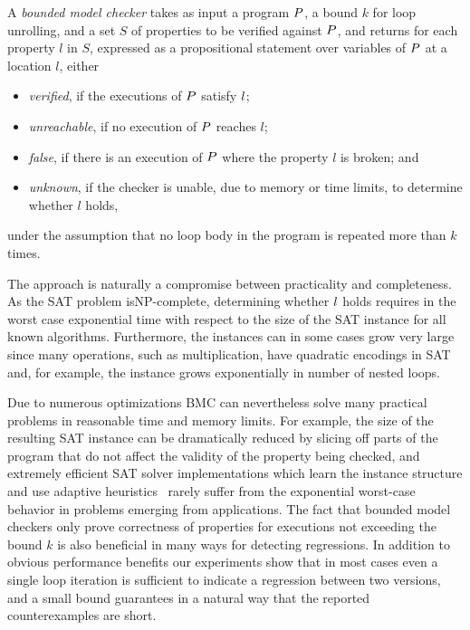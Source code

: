 A {\em bounded model checker} takes as input a program $P$, a bound $k$
for loop unrolling, and a set $S$ of properties to be verified against
$P$, and returns for each property ${l}$ in $S$, expressed as a propositional statement over variables of $P$ at a location $l$, either \vspace{-0.2cm}
\begin{itemize}
    \item \emph{verified}, if the executions of $P$  satisfy ${l}$;\vspace{-0.25cm}
    \item \emph{unreachable}, if no execution of $P$ reaches $l$;\vspace{-0.25cm}
    \item \emph{false}, if there is an execution of $P$
    where the property $l$ is broken; and\vspace{-0.25cm}
    \item \emph{unknown}, if the checker is unable, due to
    memory or time limits, to determine whether ${l}$ holds,\vspace{-0.2cm}
\end{itemize}
under the assumption that no loop body in the program is repeated more
than $k$ times.

The approach is naturally a compromise between practicality and
completeness.
%
As the SAT problem is\linebreak NP-complete, determining whether ${l}$ holds
requires in the worst case exponential time with respect to the size of
the SAT instance for all known algorithms.
%
Furthermore, the instances can in some cases grow very large since many
operations, such as multiplication, have quadratic encodings in SAT and,
for example, the instance grows exponentially in number of nested loops.
%

Due to numerous optimizations BMC can nevertheless solve many practical
problems in reasonable time and memory limits.
%
For example, the size of the resulting SAT instance can be dramatically
reduced by slicing off parts of the program that do not affect the
validity of the property being checked, and
%
extremely efficient SAT solver implementations which learn the instance
structure and use adaptive heuristics~\cite{MahajanFM:SAT04} rarely
suffer from the exponential worst-case behavior in problems emerging
from applications.
%
The fact that bounded model checkers only prove correctness of
properties for executions not exceeding the bound $k$ is also beneficial
in many ways for detecting regressions.  In addition to obvious
performance benefits our experiments show that in most cases even a single
loop iteration is sufficient to indicate a regression between two
versions, and a small bound guarantees in a natural way that the
reported counterexamples are short.

